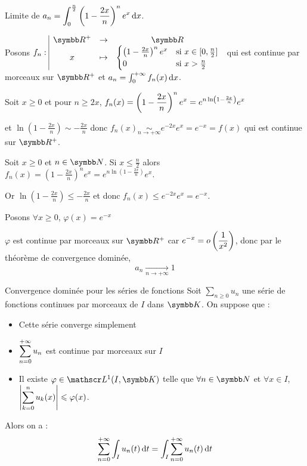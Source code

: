 \begin{exemple}
    Limite de $\displaystyle a_n = \int_{0}^{\frac n 2 } \left( 1 - \frac{2x} n \right)^n e^x \,\mathrm{d}x$.

    Posons $\fonction {f_n}{\R^+}{\R}{x}{\begin{cases}
        \left( 1 - \frac{2x} n \right)^n e^x & \text{si } x \in [0, \frac n 2] \\
        0 & \text{si } x > \frac n 2
    \end{cases}}$ qui est continue par morceaux sur $\R^+$ et 
    $a_n = \int_0^{+ \infty} f_n(x) \,\mathrm{d}x$.

    \avspace Soit $x \geqslant 0$ et pour $n \geqslant 2x$, 
    $\displaystyle f_n(x) = \left( 1 - \frac{2x} n \right)^n e^x = e^{n \ln \left( 1 - \frac{2x} n \right)} e^x$

    et $\ln \left( 1 - \frac{2x} n \right) \sim - \frac{2x} n$ donc $f_n(x) \underset{n \to + \infty}{\sim} e^{-2x} e^x = e^{-x} = f(x)$ 
    qui est continue sur $\R^+$.

    Soit $x \geqslant 0$ et $n \in \N$. Si $x \leqslant \frac n 2$ alors
    $f_n(x) = \left( 1 - \frac{2x} n \right)^n e^x = e^{n \ln \left( 1 - \frac{2x} n \right)} e^x$.
    
    Or $\ln \left( 1 - \frac{2x} n \right) \leqslant - \frac{2x} n$  
    et donc $f_n(x) \leqslant e^{-2x} e^x = e^{-x}$.

    Posons $\forall x \geqslant 0$, $\varphi(x) = e^{-x}$ 

    $\varphi$ est continue par morceaux sur $\R^+$ car $\displaystyle e^{-x} = o\left( \frac 1 {x^2} \right)$, 
    donc par le théorème de convergence dominée, 
    $$a_n \xrightarrow[n \to + \infty]{} 1$$
\end{exemple}

\begin{theoreme}{Convergence dominée pour les séries de fonctions}{}
    Soit $\sum_{n \geqslant 0} u_n$ une série de fonctions continues par morceaux de $I$ dans $\K$. 
    On suppose que : 
    \begin{itemize}
        \item Cette série converge simplement
        \item $\displaystyle \sum_{n = 0}^{+ \infty} u_n$ est continue par morceaux sur $I$
        \item Il existe $\varphi \in \mathscr L^1(I, \K)$ telle que $\forall n \in \N$ 
        et $\forall x \in I$, $\displaystyle \left| \sum_{k = 0}^{n } u_k(x) \right| \leqslant \varphi(x)$.

    \end{itemize}

    Alors on a : 
    $$\sum_{n = 0}^{+\infty} \int_I u_n(t) \,\mathrm{d}t = \int_I \sum_{n = 0}^{+ \infty} u_n(t) \,\mathrm{d}t$$
\end{theoreme}


